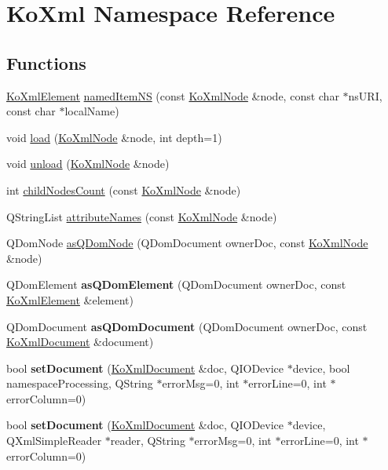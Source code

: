 \hypertarget{namespaceKoXml}{
\section{KoXml Namespace Reference}
\label{namespaceKoXml}
}
\subsection*{Functions}
\begin{CompactItemize}
\item 
\hyperlink{classKoXmlElement}{KoXmlElement} \hyperlink{namespaceKoXml_f571b501c9481cab08bbcf9b9174e4f5}{namedItemNS} (const \hyperlink{classKoXmlNode}{KoXmlNode} \&node, const char $\ast$nsURI, const char $\ast$localName)
\item 
void \hyperlink{namespaceKoXml_aa2b101e7188f027c484537851115566}{load} (\hyperlink{classKoXmlNode}{KoXmlNode} \&node, int depth=1)
\item 
void \hyperlink{namespaceKoXml_5834f749393cb5393257558484f8d2b9}{unload} (\hyperlink{classKoXmlNode}{KoXmlNode} \&node)
\item 
int \hyperlink{namespaceKoXml_741654edec9f17c65760b32b45069dcc}{childNodesCount} (const \hyperlink{classKoXmlNode}{KoXmlNode} \&node)
\item 
QStringList \hyperlink{namespaceKoXml_4859eaf343a885dc2c69889271e16b6a}{attributeNames} (const \hyperlink{classKoXmlNode}{KoXmlNode} \&node)
\item 
QDomNode \hyperlink{namespaceKoXml_a9562d7b4abde19cd063e70ca966e582}{asQDomNode} (QDomDocument ownerDoc, const \hyperlink{classKoXmlNode}{KoXmlNode} \&node)
\item 
\hypertarget{namespaceKoXml_9a009f9951bf7a5c4f1b83d6b1577bcc}{
QDomElement \textbf{asQDomElement} (QDomDocument ownerDoc, const \hyperlink{classKoXmlElement}{KoXmlElement} \&element)}
\label{namespaceKoXml_9a009f9951bf7a5c4f1b83d6b1577bcc}

\item 
\hypertarget{namespaceKoXml_a4375111a0c208d32b1d7fa18ad59553}{
QDomDocument \textbf{asQDomDocument} (QDomDocument ownerDoc, const \hyperlink{classKoXmlDocument}{KoXmlDocument} \&document)}
\label{namespaceKoXml_a4375111a0c208d32b1d7fa18ad59553}

\item 
\hypertarget{namespaceKoXml_9bdb283b140e57df55688bb3342dca07}{
bool \textbf{setDocument} (\hyperlink{classKoXmlDocument}{KoXmlDocument} \&doc, QIODevice $\ast$device, bool namespaceProcessing, QString $\ast$errorMsg=0, int $\ast$errorLine=0, int $\ast$errorColumn=0)}
\label{namespaceKoXml_9bdb283b140e57df55688bb3342dca07}

\item 
\hypertarget{namespaceKoXml_ea28cc56bb546ac838d55d863080b83e}{
bool \textbf{setDocument} (\hyperlink{classKoXmlDocument}{KoXmlDocument} \&doc, QIODevice $\ast$device, QXmlSimpleReader $\ast$reader, QString $\ast$errorMsg=0, int $\ast$errorLine=0, int $\ast$errorColumn=0)}
\label{namespaceKoXml_ea28cc56bb546ac838d55d863080b83e}

\end{CompactItemize}


